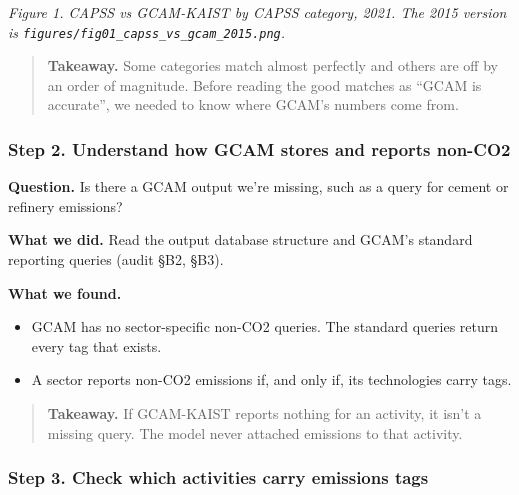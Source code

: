 \emph{Figure
1. CAPSS
vs
GCAM-KAIST
by CAPSS
category,
2021. The
2015
version is
\texttt{figures/\allowbreak{}fig01\_\allowbreak{}capss\_\allowbreak{}vs\_\allowbreak{}gcam\_\allowbreak{}2015.\allowbreak{}png}.}

\begin{quote}
\plainmark{}
\textbf{Takeaway.}
Some
categories
match
almost
perfectly
and others
are off by
an order
of
magnitude.
Before
reading
the good
matches as
``GCAM is
accurate'',
we needed
to know
where
GCAM's
numbers
come from.
\end{quote}

\hypertarget{step-2.-understand-how-gcam-stores-and-reports-non-co2}{%
\subsubsection*{Step 2. Understand how GCAM stores and reports non-CO2}\label{step-2.-understand-how-gcam-stores-and-reports-non-co2}}

\textbf{Question.}
Is there a
GCAM
output
we're
missing,
such as a
query for
cement or
refinery
emissions?

\textbf{What
we did.}
Read the
output
database
structure
and GCAM's
standard
reporting
queries
(audit
§B2, §B3).

\textbf{What
we found.}

\begin{itemize}
\tightlist
\item
  GCAM has
  no
  sector-specific
  non-CO2
  queries.
  The
  standard
  queries
  return
  every
  tag that
  exists.
\item
  A sector
  reports
  non-CO2
  emissions
  if, and
  only if,
  its
  technologies
  carry
  tags.
\end{itemize}

\begin{quote}
\plainmark{}
\textbf{Takeaway.}
If
GCAM-KAIST
reports
nothing
for an
activity,
it isn't a
missing
query. The
model
never
attached
emissions
to that
activity.
\end{quote}

\hypertarget{step-3.-check-which-activities-carry-emissions-tags}{%
\subsubsection*{Step 3. Check which activities carry emissions tags}\label{step-3.-check-which-activities-carry-emissions-tags}}


